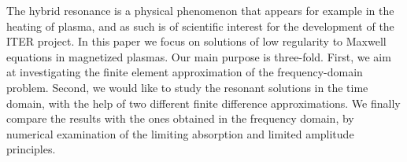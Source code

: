 The hybrid resonance is a physical phenomenon
that appears for example in the heating of plasma,
and as such is of scientific interest for the development  of  the ITER project.
In this paper we focus on solutions of low regularity to Maxwell equations in
magnetized plasmas. 
Our main purpose is three-fold. First, we aim at investigating the finite element approximation 
of the frequency-domain problem. Second, we would like to study the resonant solutions 
in the time domain, with the help of two different finite difference approximations. 
We finally  compare the results with the ones obtained in the frequency domain, by  
numerical examination of the limiting absorption and limited amplitude principles. 